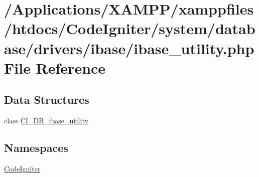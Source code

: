 \hypertarget{ibase__utility_8php}{}\section{/\+Applications/\+X\+A\+M\+P\+P/xamppfiles/htdocs/\+Code\+Igniter/system/database/drivers/ibase/ibase\+\_\+utility.php File Reference}
\label{ibase__utility_8php}
\subsection*{Data Structures}
\begin{DoxyCompactItemize}
\item 
class \mbox{\hyperlink{class_c_i___d_b__ibase__utility}{C\+I\+\_\+\+D\+B\+\_\+ibase\+\_\+utility}}
\end{DoxyCompactItemize}
\subsection*{Namespaces}
\begin{DoxyCompactItemize}
\item 
 \mbox{\hyperlink{namespace_code_igniter}{Code\+Igniter}}
\end{DoxyCompactItemize}
